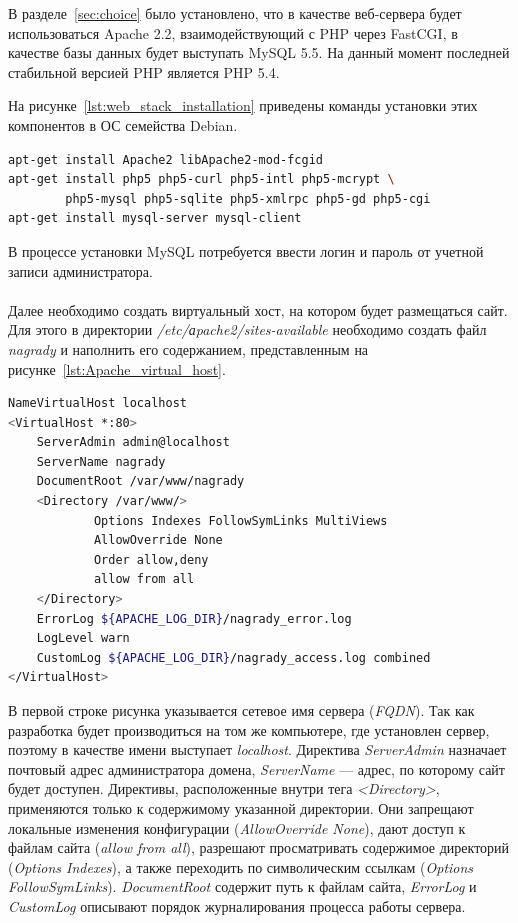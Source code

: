 В разделе~\ref{sec:choice} было установлено, что в качестве веб-сервера будет
использоваться Apache 2.2, взаимодействующий с PHP через FastCGI,
в качестве базы данных будет выступать MySQL 5.5.
На данный момент последней стабильной версией PHP является PHP 5.4. 

На рисунке~\ref{lst:web_stack_installation} приведены команды установки этих
компонентов в ОС семейства Debian.

\pagebreak

\begin{lstlisting}[language=bash,
  caption=Команды установки веб-стека для работы Drupal,
  label=lst:web_stack_installation]
apt-get install Apache2 libApache2-mod-fcgid
apt-get install php5 php5-curl php5-intl php5-mcrypt \ 
        php5-mysql php5-sqlite php5-xmlrpc php5-gd php5-cgi
apt-get install mysql-server mysql-client
\end{lstlisting}

В процессе установки MySQL потребуется ввести логин и пароль от учетной записи
администратора.

\paragraph{}
Далее необходимо создать виртуальный хост, на котором будет размещаться сайт.
Для этого в директории \textit{/etc/аpache2/sites-available} необходимо создать
файл \textit{nagrady} и наполнить его содержанием, представленным на
рисунке~\ref{lst:Apache_virtual_host}.

\begin{lstlisting}[language=bash,xleftmargin=2em,
  caption=Содержимое конфигурационного файла Apache,
  label=lst:Apache_virtual_host]
NameVirtualHost localhost
<VirtualHost *:80>
    ServerAdmin admin@localhost
    ServerName nagrady
    DocumentRoot /var/www/nagrady
    <Directory /var/www/>
            Options Indexes FollowSymLinks MultiViews
            AllowOverride None
            Order allow,deny
            allow from all
    </Directory>
    ErrorLog ${APACHE_LOG_DIR}/nagrady_error.log
    LogLevel warn
    CustomLog ${APACHE_LOG_DIR}/nagrady_access.log combined
</VirtualHost>
\end{lstlisting}

В первой строке рисунка указывается сетевое имя сервера (\textit{FQDN}). 
Так как разработка будет производиться на том же компьютере, 
где установлен сервер, поэтому в качестве имени выступает \textit{localhost}.
Директива \textit{ServerAdmin} назначает почтовый адрес администратора домена, 
\textit{ServerName} --- адрес, по которому сайт будет доступен.
Директивы, расположенные внутри тега \textit{<Directory>}, применяются только
к содержимому указанной директории.
Они запрещают локальные изменения конфигурации (\textit{AllowOverride None}),
дают доступ к файлам сайта (\textit{allow from all}),
разрешают просматривать содержимое директорий (\textit{Options Indexes}),
а также переходить по символическим ссылкам (\textit{Options FollowSymLinks}).
\textit{DocumentRoot} содержит путь к файлам сайта,
\textit{ErrorLog} и \textit{CustomLog} описывают порядок журналирования
процесса работы сервера.

